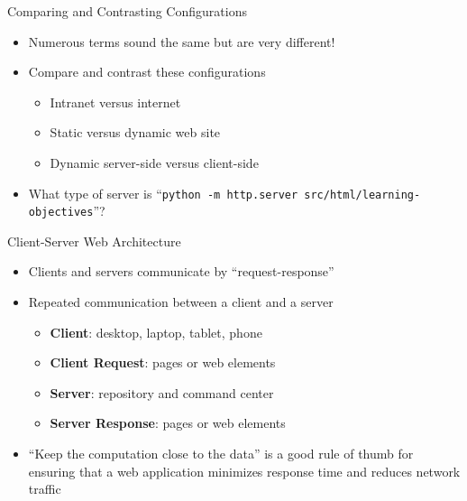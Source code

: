 \documentclass[14pt,aspectratio=169]{beamer}
\begin{document}
%
\begin{frame}{Comparing and Contrasting Configurations}
%
  \begin{itemize}
    \item Numerous terms sound the same but are very different!
    \item Compare and contrast these configurations
      \begin{itemize}
        \item Intranet versus internet
        \item Static versus dynamic web site
        \item Dynamic server-side versus client-side
      \end{itemize}
    \item What type of server is ``{\tt python -m http.server
      src/html/learning-objectives}''?
  \end{itemize}
%
\end{frame}

%
\begin{frame}{Client-Server Web Architecture}
  \begin{itemize}
    \item Clients and servers communicate by ``request-response''
      \vspace*{-.2in}
    \item Repeated communication between a client and a server
      \begin{itemize}
        \item {\bf Client}: desktop, laptop, tablet, phone
        \item {\bf Client Request}: pages or web elements
        \item {\bf Server}: repository and command center
        \item {\bf Server Response}: pages or web elements
      \end{itemize}
      \vspace*{-.2in}
    \item ``Keep the computation close to the data'' is a good rule of thumb for
      ensuring that a web application minimizes response time and reduces
      network traffic
  \end{itemize}
\end{frame}
\end{document}
